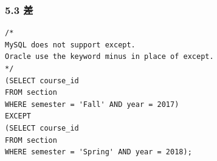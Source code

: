 \documentclass[aspectratio=169, 14pt]{beamer}
\begin{document}
\begin{frame}[fragile]
    \frametitle{5.3 差}

    \begin{verbatim}
/*
MySQL does not support except.
Oracle use the keyword minus in place of except.
*/
(SELECT course_id
FROM section
WHERE semester = 'Fall' AND year = 2017)
EXCEPT
(SELECT course_id
FROM section
WHERE semester = 'Spring' AND year = 2018);
    \end{verbatim}     

\end{frame}









    
\end{document}
